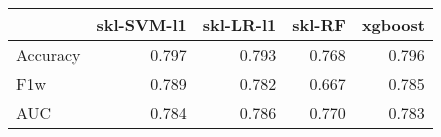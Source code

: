 \begin{tabular}{lrrrr}
\toprule
{} &  skl-SVM-l1 &  skl-LR-l1 &  skl-RF &  xgboost \\
\midrule
Accuracy &       0.797 &      0.793 &   0.768 &    0.796 \\
F1w      &       0.789 &      0.782 &   0.667 &    0.785 \\
AUC      &       0.784 &      0.786 &   0.770 &    0.783 \\
\bottomrule
\end{tabular}
